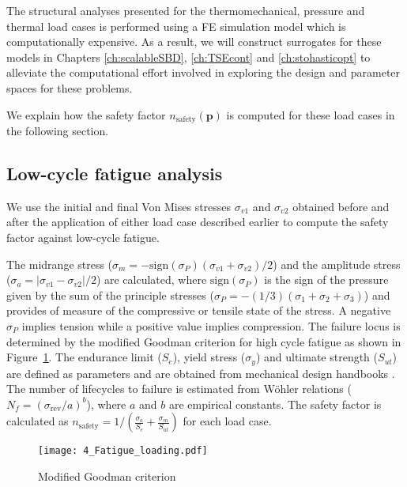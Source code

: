 The structural analyses presented for the thermomechanical, pressure and thermal load cases is performed using a \ac{FE} simulation model which is computationally expensive. As a result, we will construct surrogates for these models in Chapters \ref{ch:scalableSBD}, \ref{ch:TSEcont} and \ref{ch:stohasticopt} to alleviate the computational effort involved in exploring the design and parameter spaces for these problems.

We explain how the safety factor $n_{\textrm{safety}}(\mathbf{p})$ is computed for these load cases in the following section.

\subsection{Low-cycle fatigue analysis} \label{subsec:fatigueanalysis}

We use the initial and final Von Mises stresses $\sigma_{v1}$ and $\sigma_{v2}$ obtained before and after the application of either load case described earlier to compute the safety factor against low-cycle fatigue.

The midrange stress ($\sigma_m = -\textrm{sign}(\sigma_P)\left( \sigma_{v1} + \sigma_{v2}\right) / 2$) and the amplitude stress ($\sigma_a = \left| \sigma_{v1} - \sigma_{v2}\right| / 2$) are calculated, where $\textrm{sign}(\sigma_P)$ is the sign of the pressure given by the sum of the principle stresses ($\sigma_P = -(1/3) (\sigma_1 + \sigma_2 + \sigma_3)$) and provides of measure of the compressive or tensile state of the stress. A negative $\sigma_P$ implies tension while a positive value implies compression. The failure locus is determined by the modified Goodman criterion for high cycle fatigue as shown in Figure~\ref{fig:GMcrit}. The endurance limit ($S_e$), yield stress ($\sigma_y$) and ultimate strength ($S_{ut}$) are defined as parameters and are obtained from mechanical design handbooks \cite{Budynas2015}. The number of lifecycles to failure is estimated from W{\"o}hler relations ($N_f = \left(\sigma_{\textrm{rev}}/a\right)^b$), where $a$ and $b$ are empirical constants. The safety factor is calculated as $n_{\textrm{safety}} = 1/\left({\frac{\sigma_a}{S_e}+\frac{\sigma_m}{S_{ut}}}\right)$ for each load case.

\begin{figure}[h!]
    \centering
    \texttt{[image: 4\_Fatigue\_loading.pdf]}
    \caption{ \label{fig:GMcrit} Modified Goodman criterion }
\end{figure}


